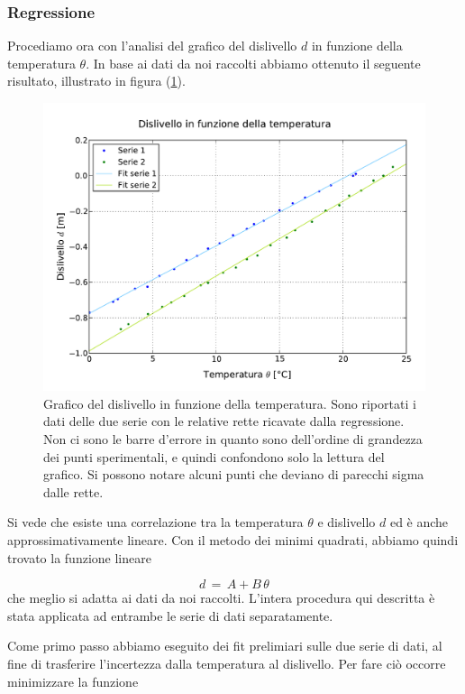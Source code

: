\subsubsection{Regressione}
\label{reg_1}

Procediamo ora con l'analisi del grafico del dislivello $d$ in funzione della temperatura $\theta$.
In base ai dati da noi raccolti abbiamo ottenuto il seguente risultato, illustrato in figura (\ref{fig:dislivello_temperatura}).

\begin{figure}
    \centering
    \includegraphics[width=120mm]{immagini/dislivello_temperatura.pdf}
    \caption{Grafico del dislivello in funzione della temperatura. Sono riportati i dati delle due serie con le relative
    rette ricavate dalla regressione. Non ci sono le barre d'errore in quanto sono dell'ordine di grandezza dei punti
    sperimentali, e quindi confondono solo la lettura del grafico. Si possono notare alcuni punti che deviano di parecchi
    sigma dalle rette.}
    \label{fig:dislivello_temperatura}
\end{figure}
%
Si vede che esiste una correlazione tra la temperatura $\theta$ e dislivello $d$ ed è anche approssimativamente lineare.
Con il metodo dei minimi quadrati, abbiamo quindi trovato la funzione lineare

\begin{equation}
	d \,=\, A + B\,\theta
	\label{h_theta}
\end{equation}
%
che meglio si adatta ai dati da noi raccolti. L'intera procedura qui descritta è stata
applicata ad entrambe le serie di dati separatamente.

Come primo passo abbiamo eseguito dei fit prelimiari sulle due serie di dati,
al fine di trasferire l'incertezza dalla temperatura al dislivello.
Per fare ciò occorre minimizzare la funzione

